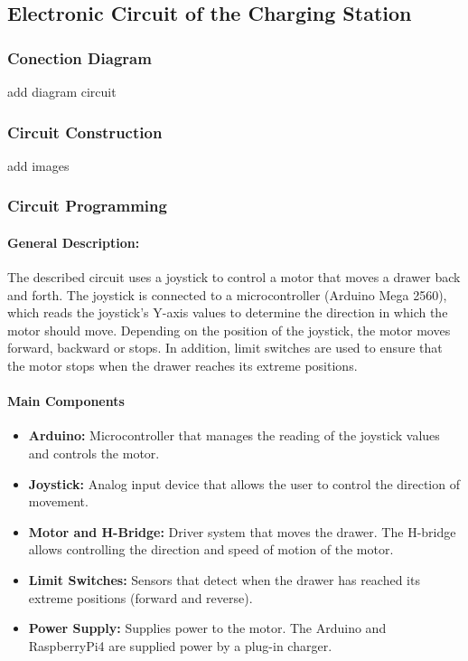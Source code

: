 
    \subsection{Electronic Circuit of the Charging Station}

    \subsubsection{Conection Diagram}
    add diagram circuit
    
    \subsubsection{Circuit Construction}
    add images
    
    \subsubsection{Circuit Programming}
    
    \paragraph{\textbf{General Description:}}
    
    
    The described circuit uses a joystick to control a motor that moves a drawer back and forth. The joystick is connected to a microcontroller (Arduino Mega 2560), which reads the joystick's Y-axis values to determine the direction in which the motor should move. Depending on the position of the joystick, the motor moves forward, backward or stops. In addition, limit switches are used to ensure that the motor stops when the drawer reaches its extreme positions.
    
    
    
    \paragraph{\textbf{Main Components}
    }
    \begin{itemize}
        \item \textbf{Arduino:} Microcontroller that manages the reading of the joystick values and controls the motor.
        \item \textbf{Joystick:} Analog input device that allows the user to control the direction of movement.
        \item \textbf{Motor and H-Bridge:} Driver system that moves the drawer. The H-bridge allows controlling the direction and speed of motion of the motor.
        \item \textbf{Limit Switches:} Sensors that detect when the drawer has reached its extreme positions (forward and reverse).
        \item \textbf{Power Supply:} Supplies power to the motor. The Arduino and RaspberryPi4 are supplied power by a plug-in charger.
    \end{itemize}
    

